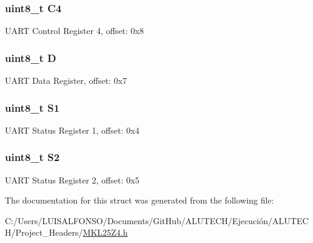 \subsubsection[{C4}]{\setlength{\rightskip}{0pt plus 5cm}uint8\+\_\+t C4}\label{struct_u_a_r_t___mem_map_a9ecb3242c606bc219190b4cb4f64600f}
U\+A\+R\+T Control Register 4, offset\+: 0x8 \hypertarget{struct_u_a_r_t___mem_map_a42ede28e876dcdb2ce2ddd730de0401e}{}
\subsubsection[{D}]{\setlength{\rightskip}{0pt plus 5cm}uint8\+\_\+t D}\label{struct_u_a_r_t___mem_map_a42ede28e876dcdb2ce2ddd730de0401e}
U\+A\+R\+T Data Register, offset\+: 0x7 \hypertarget{struct_u_a_r_t___mem_map_a61370495fe05fc15ca074ec7a5c2d99f}{}
\subsubsection[{S1}]{\setlength{\rightskip}{0pt plus 5cm}uint8\+\_\+t S1}\label{struct_u_a_r_t___mem_map_a61370495fe05fc15ca074ec7a5c2d99f}
U\+A\+R\+T Status Register 1, offset\+: 0x4 \hypertarget{struct_u_a_r_t___mem_map_a7ff71460633a0ef4ba8d6a700d49b993}{}
\subsubsection[{S2}]{\setlength{\rightskip}{0pt plus 5cm}uint8\+\_\+t S2}\label{struct_u_a_r_t___mem_map_a7ff71460633a0ef4ba8d6a700d49b993}
U\+A\+R\+T Status Register 2, offset\+: 0x5 

The documentation for this struct was generated from the following file\+:\begin{DoxyCompactItemize}
\item 
C\+:/\+Users/\+L\+U\+I\+S\+A\+L\+F\+O\+N\+S\+O/\+Documents/\+Git\+Hub/\+A\+L\+U\+T\+E\+C\+H/\+Ejecución/\+A\+L\+U\+T\+E\+C\+H/\+Project\+\_\+\+Headers/\hyperlink{_m_k_l25_z4_8h}{M\+K\+L25\+Z4.\+h}\end{DoxyCompactItemize}
